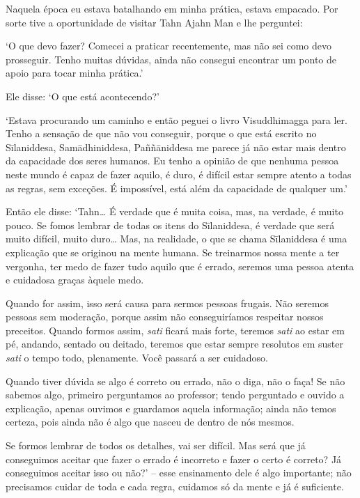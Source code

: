 Naquela época eu estava batalhando em minha prática, estava empacado.
Por sorte tive a oportunidade de visitar Tahn Ajahn Man e lhe perguntei:

`O que devo fazer? Comecei a praticar recentemente, mas não sei como
devo prosseguir. Tenho muitas dúvidas, ainda não consegui encontrar um
ponto de apoio para tocar minha prática.'

Ele disse: `O que está acontecendo?'

`Estava procurando um caminho e então peguei o livro Visuddhimagga para
ler. Tenho a sensação de que não vou conseguir, porque o que está
escrito no Sīlaniddesa, Samādhiniddesa, Paññāniddesa me parece já não
estar mais dentro da capacidade dos seres humanos. Eu tenho a opinião de
que nenhuma pessoa neste mundo é capaz de fazer aquilo, é duro, é
difícil estar sempre atento a todas as regras, sem exceções. É
impossível, está além da capacidade de qualquer um.'

Então ele disse: `Tahn\ldots{} É verdade que é muita coisa, mas, na
verdade, é muito pouco. Se fomos lembrar de todas os itens do
Sīlaniddesa, é verdade que será muito difícil, muito duro\ldots{} Mas,
na realidade, o que se chama Sīlaniddesa é uma explicação que se
originou na mente humana. Se treinarmos nossa mente a ter vergonha, ter
medo de fazer tudo aquilo que é errado, seremos uma pessoa atenta e
cuidadosa graças àquele medo.

Quando for assim, isso será causa para sermos pessoas frugais. Não
seremos pessoas sem moderação, porque assim não conseguiríamos respeitar
nossos preceitos. Quando formos assim, \emph{sati} ficará mais forte,
teremos \emph{sati} ao estar em pé, andando, sentado ou deitado, teremos
que estar sempre resolutos em suster \emph{sati} o tempo todo,
plenamente. Você passará a ser cuidadoso.

Quando tiver dúvida se algo é correto ou errado, não o diga, não o faça!
Se não sabemos algo, primeiro perguntamos ao professor; tendo perguntado
e ouvido a explicação, apenas ouvimos e guardamos aquela informação;
ainda não temos certeza, pois ainda não é algo que nasceu de dentro de
nós mesmos.

Se formos lembrar de todos os detalhes, vai ser difícil. Mas será que já
conseguimos aceitar que fazer o errado é incorreto e fazer o certo é
correto? Já conseguimos aceitar isso ou não?' -- esse ensinamento dele é
algo importante; não precisamos cuidar de toda e cada regra, cuidamos só
da mente e já é suficiente.

